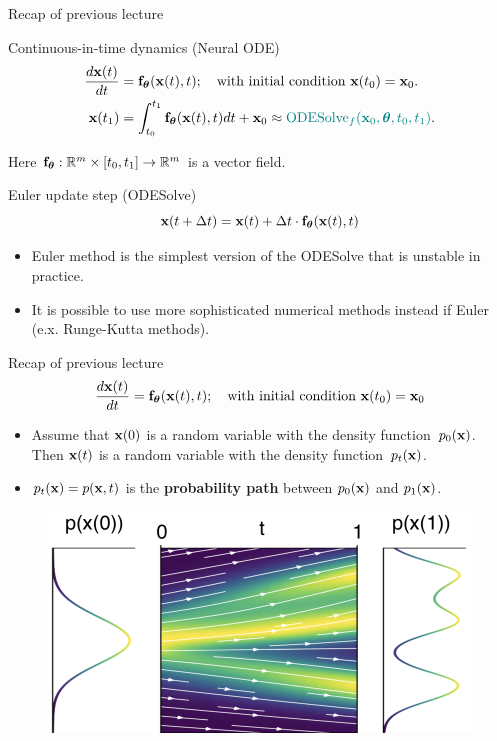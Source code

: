 \begin{frame}{Recap of previous lecture}
	\begin{block}{Continuous-in-time dynamics (Neural ODE)}
		\vspace{-0.5cm}
		\begin{align*}
			\frac{d \mathbf{x}(t)}{dt} &= \mathbf{f}_{\boldsymbol{\theta}}(\mathbf{x}(t), t); \quad \text{with initial condition }\mathbf{x}(t_0) = \mathbf{x}_0. \\
			\mathbf{x}(t_1) &= \int^{t_1}_{t_0} \mathbf{f}_{\boldsymbol{\theta}}(\mathbf{x}(t), t) d t  + \mathbf{x}_0 \approx {\color{teal}\text{ODESolve}_f(\mathbf{x}_0, \boldsymbol{\theta}, t_0, t_1)}.
		\end{align*}
		\vspace{-0.5cm}
	\end{block}
	Here $\mathbf{f}_{\boldsymbol{\theta}}: \mathbb{R}^m \times [t_0, t_1] \rightarrow \mathbb{R}^m$ is a vector field.
	\begin{block}{Euler update step (ODESolve)}
		\vspace{-0.3cm}
		\[
  			\mathbf{x}(t + \Delta t) = \mathbf{x}(t) + \Delta t \cdot \mathbf{f}_{\boldsymbol{\theta}}(\mathbf{x}(t), t)
		\]
	\end{block}
	\begin{itemize}
		\item Euler method is the simplest version of the ODESolve that is unstable in practice.
		\item It is possible to use more sophisticated numerical methods instead if Euler (e.x. Runge-Kutta methods).
	\end{itemize}
\end{frame}
\begin{frame}{Recap of previous lecture}
	\vspace{-0.3cm}
	\[
 		\frac{d \mathbf{x}(t)}{dt} = \mathbf{f}_{\boldsymbol{\theta}}(\mathbf{x}(t), t); \quad \text{with initial condition }\mathbf{x}(t_0) = \mathbf{x}_0
	\]
	\vspace{-0.3cm}
	\begin{itemize}
		\item Assume that $\mathbf{x}(0)$ is a random variable with the density function~$p_0(\mathbf{x})$. Then $\mathbf{x}(t)$ is a random variable with the density function~$p_t(\mathbf{x})$.
		\item$p_t(\mathbf{x}) = p(\mathbf{x}, t)$ is the \textbf{probability path} between $p_0(\mathbf{x})$ and $p_1(\mathbf{x})$.
	\end{itemize}
	\begin{figure}
		\centering
		\includegraphics[width=0.7\linewidth]{figs/cnf_flow.png}
	\end{figure}
\end{frame}
